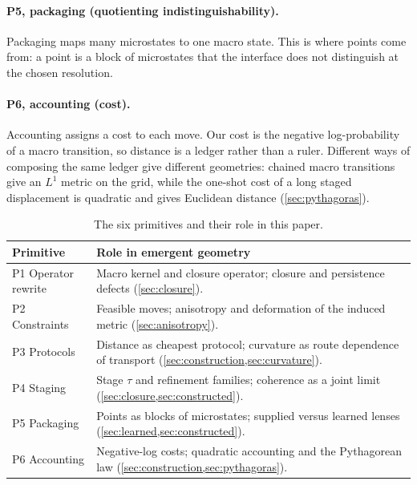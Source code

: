\paragraph{P5, packaging (quotienting indistinguishability).}
Packaging maps many microstates to one macro state.
This is where points come from: a point is a block of microstates that the interface does not distinguish at the chosen resolution.

\paragraph{P6, accounting (cost).}
Accounting assigns a cost to each move.
Our cost is the negative log-probability of a macro transition, so distance is a ledger rather than a ruler.
Different ways of composing the same ledger give different geometries: chained macro transitions give an $L^1$ metric on the grid, while the one-shot cost of a long staged displacement is quadratic and gives Euclidean distance (\cref{sec:pythagoras}).

\begin{table}[t]
\centering
\small
\caption{The six primitives and their role in this paper.}
\label{tab:six-birds-geometry}
\begin{tabularx}{\textwidth}{@{}>{\raggedright\arraybackslash}p{}X@{}}
\toprule
Primitive & Role in emergent geometry \\
\midrule
P1 Operator rewrite & Macro kernel and closure operator; closure and persistence defects (\cref{sec:closure}). \\
P2 Constraints & Feasible moves; anisotropy and deformation of the induced metric (\cref{sec:anisotropy}). \\
P3 Protocols & Distance as cheapest protocol; curvature as route dependence of transport (\cref{sec:construction,sec:curvature}). \\
P4 Staging & Stage $\tau$ and refinement families; coherence as a joint limit (\cref{sec:closure,sec:constructed}). \\
P5 Packaging & Points as blocks of microstates; supplied versus learned lenses (\cref{sec:learned,sec:constructed}). \\
P6 Accounting & Negative-log costs; quadratic accounting and the Pythagorean law (\cref{sec:construction,sec:pythagoras}). \\
\bottomrule
\end{tabularx}
\end{table}
